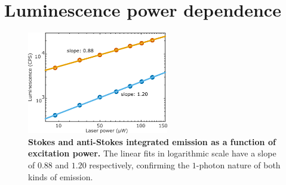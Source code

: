 \documentclass[journal=nalefd,manuscript=letter]{achemso}
\begin{document}
%
%
%


\pagebreak
\section{Luminescence power dependence}

\begin{figure}[htp] \centering
\includegraphics[width=0.55\textwidth]{Figures/Supplementary/03_AS_S_in_Log/03_AS_S_in_Log.png}
\caption{\textbf{Stokes and anti-Stokes integrated emission as a function of excitation power.} The
linear fits in logarithmic scale have a slope of $0.88$ and $1.20$ respectively,
confirming the $1$-photon nature of both kinds of emission.}
	\label{fig:Log_Plot}
\end{figure}
\end{document}
